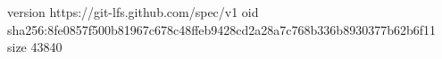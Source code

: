 version https://git-lfs.github.com/spec/v1
oid sha256:8fe0857f500b81967c678c48ffeb9428cd2a28a7c768b336b8930377b62b6f11
size 43840
